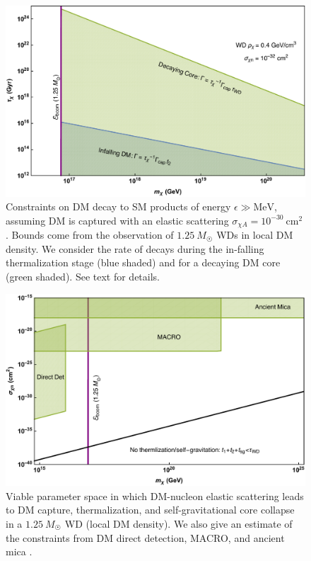 \documentclass[preprintnumbers,amsmath,amssymb,prd,superscriptaddress]{revtex4}
\newcommand{\MeV}{\text{MeV}}
\newcommand{\cm}{\text{cm}}
\begin{document}
\begin{figure}
\includegraphics[scale=.45]{capturedecay.pdf}
\caption{Constraints on DM decay to SM products of energy $\epsilon \gg \MeV$, assuming DM is captured with an elastic scattering $\sigma_{\chi A} = 10^{-30} ~\cm^2$.
Bounds come from the observation of $1.25~M_{\astrosun}$ WDs in local DM density.
We consider the rate of decays during the in-falling thermalization stage (blue shaded) and for a decaying DM core (green shaded). See text for details.
}
\label{fig:capture-decay}
\end{figure}

\begin{figure}
\includegraphics[scale=.45]{elasticcapture.pdf}
\caption{Viable parameter space in which DM-nucleon elastic scattering leads to DM capture, thermalization, and self-gravitational core collapse in a $1.25 ~M_{\astrosun}$ WD (local DM density).
We also give an estimate of the constraints from DM direct detection, MACRO, and ancient mica \cite{Jacobs:2014yca}.
}
\label{fig:elastic-capture}
\end{figure}
\end{document}
